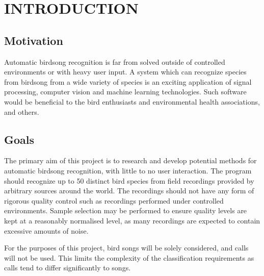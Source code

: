 \chapter{INTRODUCTION}

\section{Motivation}
Automatic birdsong recognition is far from solved outside of controlled
environments or with heavy user input.
A system which can recognize species from birdsong from a wide variety of
species is an exciting application of signal processing, computer vision and
machine learning technologies.
Such software would be beneficial to the bird enthusiasts and environmental
health associations, and others.

\section{Goals}
The primary aim of this project is to research and develop potential methods
for automatic birdsong recognition, with little to no user interaction.
The program should recognize up to 50 distinct bird species from field recordings
provided by arbitrary sources around the world.
The recordings should not have any form of rigorous quality control such as
recordings performed under controlled environments.
Sample selection may be performed to ensure quality levels are kept at a
reasonably normalised level, as many recordings are expected to contain
excessive amounts of noise.

For the purposes of this project, bird songs will be solely considered, and calls
will not be used.
This limits the complexity of the classification requirements as calls tend to
differ significantly to songs.
